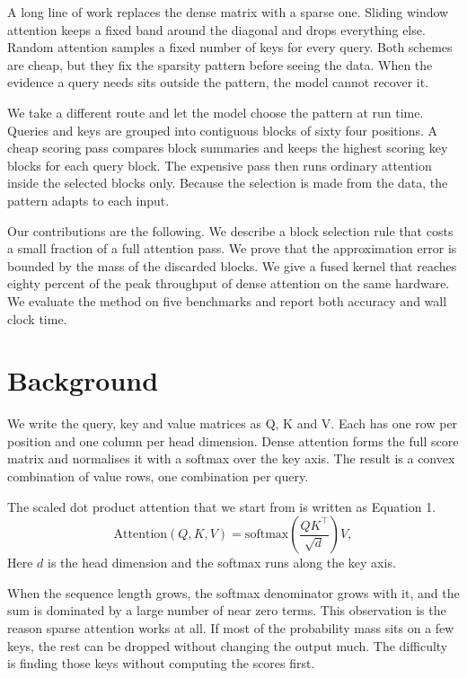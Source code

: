 \documentclass[10pt,twocolumn,a4paper]{article}
\newcommand{\s}[1]{#1}
\begin{document}
\s{A long line of work replaces the dense matrix with a sparse one.}
\s{Sliding window attention keeps a fixed band around the diagonal and drops everything else.}
\s{Random attention samples a fixed number of keys for every query.}
\s{Both schemes are cheap, but they fix the sparsity pattern before seeing the data.}
\s{When the evidence a query needs sits outside the pattern, the model cannot recover it.}

\s{We take a different route and let the model choose the pattern at run time.}
\s{Queries and keys are grouped into contiguous blocks of sixty four positions.}
\s{A cheap scoring pass compares block summaries and keeps the highest scoring key blocks for each query block.}
\s{The expensive pass then runs ordinary attention inside the selected blocks only.}
\s{Because the selection is made from the data, the pattern adapts to each input.}

\s{Our contributions are the following.}
\s{We describe a block selection rule that costs a small fraction of a full attention pass.}
\s{We prove that the approximation error is bounded by the mass of the discarded blocks.}
\s{We give a fused kernel that reaches eighty percent of the peak throughput of dense attention on the same hardware.}
\s{We evaluate the method on five benchmarks and report both accuracy and wall clock time.}

\section{Background}

\s{We write the query, key and value matrices as Q, K and V.}
\s{Each has one row per position and one column per head dimension.}
\s{Dense attention forms the full score matrix and normalises it with a softmax over the key axis.}
\s{The result is a convex combination of value rows, one combination per query.}

\s{The scaled dot product attention that we start from is written as Equation 1.}
\begin{equation}
  \mathrm{Attention}(Q, K, V) = \mathrm{softmax}\!\left( \frac{Q K^{\top}}{\sqrt{d}} \right) V ,
  \label{eq:attn}
\end{equation}
\s{Here $d$ is the head dimension and the softmax runs along the key axis.}

\s{When the sequence length grows, the softmax denominator grows with it, and the sum is dominated by a large number of near zero terms.}
\s{This observation is the reason sparse attention works at all.}
\s{If most of the probability mass sits on a few keys, the rest can be dropped without changing the output much.}
\s{The difficulty is finding those keys without computing the scores first.}
\end{document}
